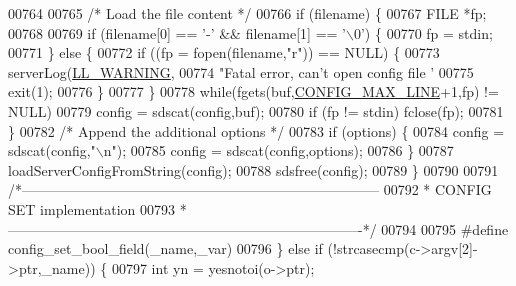 \begin{DoxyCode}
{{{{{00764 
00765     \textcolor{comment}{/* Load the file content */}
00766     \textcolor{keywordflow}{if} (filename) \{
00767         FILE *fp;
00768 
00769         \textcolor{keywordflow}{if} (filename[0] == \textcolor{stringliteral}{'-'} && filename[1] == \textcolor{stringliteral}{'\(\backslash\)0'}) \{
00770             fp = stdin;
00771         \} \textcolor{keywordflow}{else} \{
00772             \textcolor{keywordflow}{if} ((fp = fopen(filename,\textcolor{stringliteral}{"r"})) == NULL) \{
00773                 serverLog(\hyperlink{server_8h_a31229b9334bba7d6be2a72970967a14b}{LL\_WARNING},
00774                     \textcolor{stringliteral}{"Fatal error, can't open config file '%
00775                 exit(1);
00776             \}
00777         \}
00778         \textcolor{keywordflow}{while}(fgets(buf,\hyperlink{server_8h_a0d8887ba7f096f153f904f206986a9fc}{CONFIG\_MAX\_LINE}+1,fp) != NULL)
00779             config = sdscat(config,buf);
00780         \textcolor{keywordflow}{if} (fp != stdin) fclose(fp);
00781     \}
00782     \textcolor{comment}{/* Append the additional options */}
00783     \textcolor{keywordflow}{if} (options) \{
00784         config = sdscat(config,\textcolor{stringliteral}{"\(\backslash\)n"});
00785         config = sdscat(config,options);
00786     \}
00787     loadServerConfigFromString(config);
00788     sdsfree(config);
00789 \}
00790 
00791 \textcolor{comment}{/*-----------------------------------------------------------------------------}
00792 \textcolor{comment}{ * CONFIG SET implementation}
00793 \textcolor{comment}{ *----------------------------------------------------------------------------*/}
00794 
00795 \textcolor{preprocessor}{#}\textcolor{preprocessor}{define} \textcolor{preprocessor}{config\_set\_bool\_field}\textcolor{preprocessor}{(}\textcolor{preprocessor}{\_name}\textcolor{preprocessor}{,}\textcolor{preprocessor}{\_var}\textcolor{preprocessor}{)}
00796     \textcolor{preprocessor}{\}} \textcolor{keywordflow}{else} \textcolor{keywordflow}{if} \textcolor{preprocessor}{(}\textcolor{preprocessor}{!}\textcolor{preprocessor}{strcasecmp}\textcolor{preprocessor}{(}\textcolor{preprocessor}{c}\textcolor{preprocessor}{->}\textcolor{preprocessor}{argv}\textcolor{preprocessor}{[}2\textcolor{preprocessor}{]}\textcolor{preprocessor}{->}\textcolor{preprocessor}{ptr}\textcolor{preprocessor}{,}\textcolor{preprocessor}{\_name}\textcolor{preprocessor}{)}\textcolor{preprocessor}{)} \textcolor{preprocessor}{\{}
00797         \textcolor{keywordtype}{int} \textcolor{preprocessor}{yn} \textcolor{preprocessor}{=} \textcolor{preprocessor}{yesnotoi}\textcolor{preprocessor}{(}\textcolor{preprocessor}{o}\textcolor{preprocessor}{->}\textcolor{preprocessor}{ptr}\textcolor{preprocessor}{)}\textcolor{preprocessor}{;}
}}}}}}
\end{DoxyCode}
